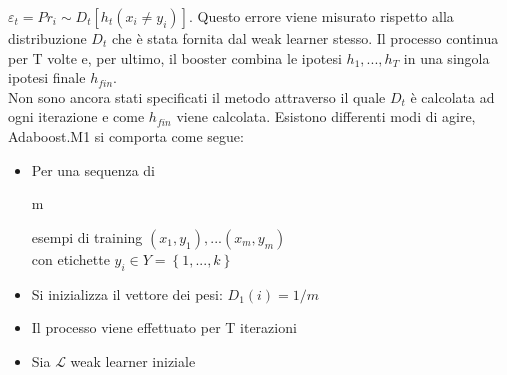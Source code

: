 \begin{math} \varepsilon_t=Pr{_i\sim D_t} [h_t(x_i\ne y_i)] \end{math}. Questo errore
viene misurato rispetto alla distribuzione \begin{math}D_t\end{math} che \`e stata fornita dal weak learner stesso.
Il processo continua per T volte e, per ultimo, 
il booster combina le ipotesi \begin{math}h_1, ... , h_T\end{math}
in una singola ipotesi finale \begin{math}h_{fin}\end{math}.\\
\newline
Non sono ancora stati specificati il metodo attraverso il quale \begin{math}D_t\end{math} \`e calcolata 
ad ogni iterazione e come \begin{math}h_{fin}\end{math} viene calcolata.
Esistono differenti modi di agire, Adaboost.M1 si comporta come segue:




\begin{itemize}
\item Per una sequenza di \begin{it}m\end{it} esempi di training 
\begin{math}(x_1,y_1), ... (x_m,y_m)\end{math}\\
con etichette \begin{math}y_i\in Y = \left\{1, ..., k\right\}\end{math}
\item Si inizializza il vettore dei pesi: \begin{math} D_1(i)=1/m \end{math}
\item Il processo viene effettuato per T iterazioni
\item Sia \begin{math} \mathcal{L} \end{math} weak learner iniziale
\end{itemize}

